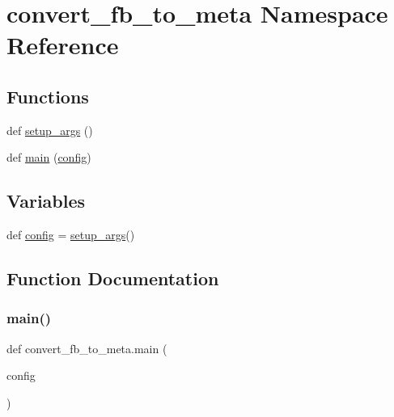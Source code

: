 \hypertarget{namespaceconvert__fb__to__meta}{}\section{convert\+\_\+fb\+\_\+to\+\_\+meta Namespace Reference}
\label{namespaceconvert__fb__to__meta}
\subsection*{Functions}
\begin{DoxyCompactItemize}
\item 
def \hyperlink{namespaceconvert__fb__to__meta_ab2c8081cc658ecbcca1960069eb0ea73}{setup\+\_\+args} ()
\item 
def \hyperlink{namespaceconvert__fb__to__meta_a6c4fef5a2121d218bf66955fe4025f6b}{main} (\hyperlink{namespaceconvert__fb__to__meta_a3de7431f5a2c098e62a0d7e93b8931ab}{config})
\end{DoxyCompactItemize}
\subsection*{Variables}
\begin{DoxyCompactItemize}
\item 
def \hyperlink{namespaceconvert__fb__to__meta_a3de7431f5a2c098e62a0d7e93b8931ab}{config} = \hyperlink{namespaceconvert__fb__to__meta_ab2c8081cc658ecbcca1960069eb0ea73}{setup\+\_\+args}()
\end{DoxyCompactItemize}


\subsection{Function Documentation}
\mbox{\label{namespaceconvert__fb__to__meta_a6c4fef5a2121d218bf66955fe4025f6b}} 
\subsubsection{\texorpdfstring{main()}{main()}}
{\footnotesize\ttfamily def convert\+\_\+fb\+\_\+to\+\_\+meta.\+main (\begin{DoxyParamCaption}\item[{}]{config }\end{DoxyParamCaption})}

